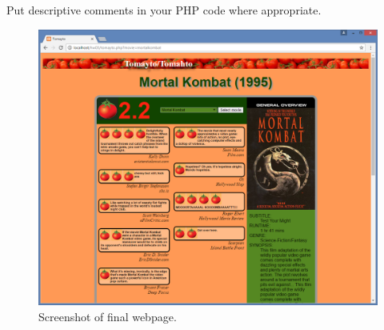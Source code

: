 \documentclass{article}
\begin{document}
Put descriptive comments in your PHP code where appropriate.

\begin{figure}
  \includegraphics[width=\textwidth]{images/screenshot.png}
  \caption{Screenshot of final webpage.}
\label{screenshot}
\end{figure}
\end{document}
